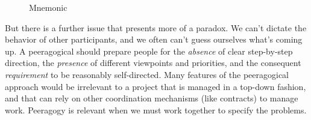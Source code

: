 \begin{wrapfigure}{l}{.52\textwidth}
\vspace{-2.8cm}
\hspace{-.15cm}\resizebox{.55\textwidth}{!}{

}
\hspace{.4cm}
\vspace{-2.95cm}
\caption{Mnemonic \label{mnemonic}}
\vspace{-.6cm}
\end{wrapfigure}

But there is a further issue that presents more of a paradox.  We can't
dictate the behavior of other participants, and we often can't 
guess ourselves what's coming up.  A peeragogical
 should prepare people for the \emph{absence} of
clear step-by-step direction, the \emph{presence} of different
viewpoints and priorities, and the consequent \emph{requirement} to be
reasonably self-directed.  Many features of the peeragogical approach
would be irrelevant to a project that is managed in a top-down fashion,
and that can rely on other coordination mechanisms (like contracts) to
manage work.  Peeragogy is relevant when we must work together to specify the problems.


